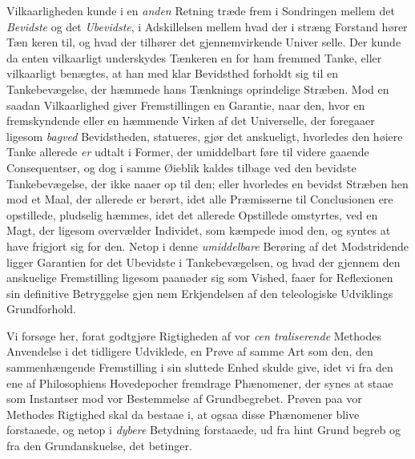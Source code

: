 Vilkaarligheden kunde i en \emph{anden} Retning træde frem
i Sondringen mellem det \emph{Bevidste} og det \emph{Ubevidste}, i
Adskillelsen mellem hvad der i stræng Forstand hører Tæn\-%
keren til, og hvad der tilhører det gjennemvirkende Univer\-%
selle. Der kunde da enten vilkaarligt underskydes Tænkeren
en for ham fremmed Tanke, eller vilkaarligt benægtes, at han
med klar Bevidsthed forholdt sig til en Tankebevægelse, der
hæmmede hans Tænknings oprindelige Stræben. Mod en
saadan Vilkaarlighed giver Fremstillingen en Garantie, naar
den, hvor en fremskyndende eller en hæmmende Virken af
det Universelle, der foregaaer ligesom \emph{bagved} Bevidstheden,
statueres, gjør det anskueligt, hvorledes den høiere Tanke
allerede \emph{er} udtalt i Former, der umiddelbart føre til videre\-%
gaaende Consequentser, og dog i samme Øieblik kaldes tilbage
ved den bevidste Tankebevægelse, der ikke naaer op til den;
eller hvorledes en bevidst Stræben hen mod et Maal, der
allerede er berørt, idet alle Præmisserne til Conclusionen
ere opstillede, pludselig hæmmes, idet det allerede Opstillede
omstyrtes, ved en Magt, der ligesom overvælder Individet,
som kæmpede imod den, og syntes at have frigjort sig for den.
Netop i denne \emph{umiddelbare} Berøring af det Modstridende
ligger Garantien for det Ubevidste i Tankebevægelsen, og hvad
der gjennem den anskuelige Fremstilling ligesom paanøder sig
som Vished, faaer for Reflexionen sin definitive Betryggelse gjen\-%
nem Erkjendelsen af den teleologiske Udviklings Grundforhold.

Vi forsøge her, forat godtgjøre Rigtigheden af vor \emph{cen\-%
traliserende} Methodes Anvendelse i det tidligere Udviklede,
en Prøve af samme Art som den, den sammenhængende
Fremstilling i sin sluttede Enhed skulde give, idet vi fra den
ene af Philosophiens Hovedepocher fremdrage Phænomener,
der synes at staae som Instantser mod vor Bestemmelse af
Grundbegrebet. Prøven paa vor Methodes Rigtighed skal da
bestaae i, at ogsaa disse Phænomener blive forstaaede, og
netop i \emph{dybere} Betydning forstaaede, ud fra hint Grund\-%
begreb og fra den Grundanskuelse, det betinger.

